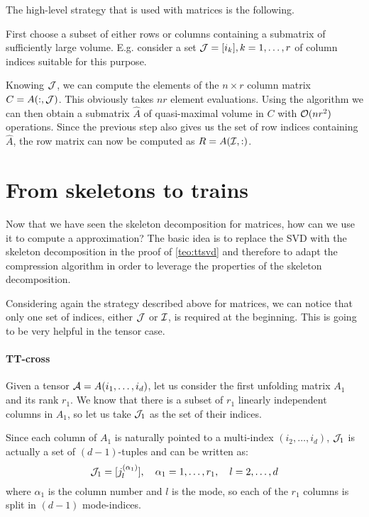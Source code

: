 The high-level strategy that is used with matrices is the following.

First choose a subset of either rows or columns containing a submatrix of sufficiently large volume. E.g. consider a set $\mathcal{J} = [i_k], k=1,\ldots,r$ of column indices suitable for this purpose.

Knowing $\mathcal{J}$, we can compute the elements of the $n \times r$ column matrix $C = A(:,\mathcal{J})$. This obviously takes $nr$ element evaluations.
Using the  algorithm we can then obtain a submatrix $\hat{A}$ of quasi-maximal volume in $C$ with $\mathcal{O}(nr^2)$ operations.
Since the previous step also gives us the set of row indices containing $\hat{A}$, the row matrix can now be computed as $R = A(\mathcal{I},:)$.

\section{From skeletons to trains}
Now that we have seen the skeleton decomposition for matrices, how can we use it to compute a  approximation?
The basic idea is to replace the SVD with the skeleton decomposition in the proof of \ref{teo:ttsvd} and therefore to adapt the  compression algorithm in order to leverage the properties of the skeleton decomposition.

Considering again the strategy described above for matrices, we can notice that only one set of indices, either $\mathcal{J}$ or $\mathcal{I}$, is required at the beginning. This is going to be very helpful in the tensor case.

\paragraph{TT-cross}
Given a tensor $\mathcal{A} = A(i_1,\ldots,i_d)$, let us consider the first unfolding matrix $A_1$ and its rank $r_1$. We know that there is a subset of $r_1$ linearly independent columns in $A_1$, so let us take $\mathcal{J}_1$ as the set of their indices.

Since each column of $A_1$ is naturally pointed to a multi-index $(i_2,\ldots,i_d)$, $\mathcal{J}_1$ is actually a set of $(d-1)$-tuples and can be written as:
\begin{equation*}
  \mathcal{J}_1 = [j_l^{(\alpha_1)}], \quad \alpha_1 = 1,\ldots,r_1, \quad l = 2,\ldots,d
\end{equation*}
where $\alpha_1$ is the column number and $l$ is the mode, so each of the $r_1$ columns is split in $(d-1)$ mode-indices.

